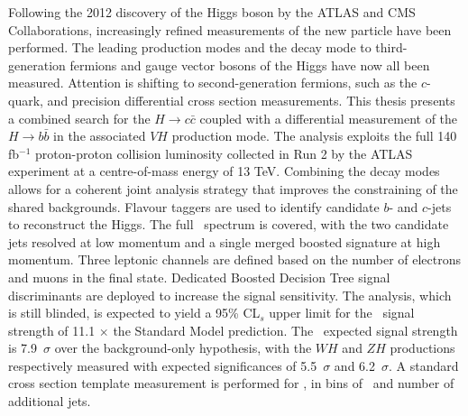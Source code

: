Following the 2012 discovery of the Higgs boson by the ATLAS and CMS Collaborations, increasingly refined measurements of the new particle have been performed. The leading production modes and the decay mode to third-generation fermions and gauge vector bosons of the Higgs have now all been measured. Attention is shifting to second-generation fermions, such as the $c$-quark, and precision differential cross section measurements. This thesis presents a combined search for the $H \rightarrow c\bar{c}$ coupled with a differential measurement of the $H \rightarrow b\bar{b}$ in the associated $VH$ production mode. The analysis exploits the full 140 fb$^{-1}$ proton-proton collision luminosity collected in Run 2 by the ATLAS experiment at a centre-of-mass energy of 13 TeV. Combining the decay modes allows for a coherent joint analysis strategy that improves the constraining of the shared backgrounds. Flavour taggers are used to identify candidate $b$- and $c$-jets to reconstruct the Higgs. The full \pt\ spectrum is covered, with the two candidate jets resolved at low momentum and a single merged boosted signature at high momentum. Three leptonic channels are defined based on the number of electrons and muons in the final state. Dedicated Boosted Decision Tree signal discriminants are deployed to increase the signal sensitivity. The analysis, which is still blinded, is expected to yield a 95\% CL$_s$ upper limit for the \vhc\ signal strength of 11.1 $\times$ the Standard Model prediction. The \vhb\ expected signal strength is 7.9~$\sigma$ over the background-only hypothesis, with the $WH$ and $ZH$ productions respectively measured with expected significances of 5.5~$\sigma$ and 6.2~$\sigma$. A standard cross section template measurement is performed for \vhb, in bins of \pt\ and number of additional jets.
\vspace*{\fill}
    